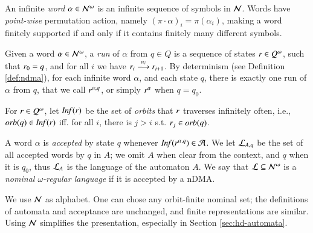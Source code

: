\begin{definition}
\label{def:inf-word}
 An infinite \emph{word} $\alpha \in \mathcal{N}^\omega$ is an infinite sequence of symbols in $\mathcal{N}$. Words have \emph{point-wise} permutation action, namely $(\pi \cdot \alpha)_i = \pi(\alpha_i)$, making a word finitely supported if and only if it contains finitely many different symbols. 
\end{definition}

\begin{definition}\label{def:nominal-run}
 Given a word $\alpha \in \mathcal{N}^\omega$, a \emph{run} of $\alpha$ from $q \in Q$ is a sequence of states $r \in Q^\omega$, such that $r_0 = q$, and for all $i$ we have $r_i \overset{\alpha_i}{\longrightarrow} r_{i+1}$. 
 By determinism (see Definition \ref{def:ndma}), for each infinite word $\alpha$, and each state $q$, there is exactly one run of $\alpha$ from $q$, that we call $r^{\alpha,q}$, or simply $r^{\alpha}$ when $q=q_0$.
\end{definition}

\begin{definition}\label{def:inf-set}
 For $r \in Q^\omega$, let $\mathit{Inf}(r)$ be the set of \emph{orbits} that $r$ traverses infinitely often, i.e., $\mathit{orb}(q) \in \mathit{Inf}(r)$ iff. for all $i$, there is $j > i$ s.t. $r_j \in \mathit{orb}(q)$.
\end{definition}

\begin{definition}
 A word $\alpha$ is \emph{accepted} by state $q$ whenever $\mathit{Inf}(r^{\alpha,q}) \in \mathcal{A}$. We let $\mathcal{L}_{A,q}$ be the set of all accepted words by $q$ in $A$; we omit $A$ when clear from the context, and $q$ when it is $q_0$, thus $\mathcal{L}_A$ is the language of the automaton $A$. We say that $\mathcal{L} \subseteq \mathcal{N}^\omega$ is a \emph{nominal $\omega$-regular language} if it is accepted by a nDMA.
\end{definition}

\begin{remark}\label{rem:simple-alphabet} We use $\mathcal{N}$ as alphabet. One can chose any orbit-finite nominal set; the definitions of automata and acceptance are unchanged, and finite representations are similar. Using $\mathcal{N}$ simplifies the presentation, especially in Section \ref{sec:hd-automata}.
\end{remark}

